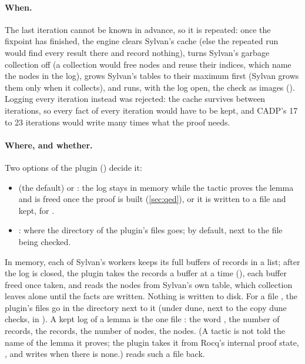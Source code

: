 \paragraph{When.} The last iteration cannot be known in advance, so it is
repeated: once the fixpoint has finished, the engine clears Sylvan's cache
(else the repeated run would find every result there and record nothing),
turns Sylvan's garbage collection off (a collection would free nodes and
reuse their indices, which name the nodes in the log), grows Sylvan's
tables to their maximum first (Sylvan grows them only when it collects),
and runs, with the log open, the check as images
(). Logging every
iteration instead was rejected: the cache survives between iterations, so
every fact of every iteration would have to be kept, and CADP's 17 to 23
iterations would write many times what the proof needs.

\paragraph{Where, and whether.} Two options of the plugin
() decide it:
\begin{itemize}
\item {} (the default) or :
  the log stays in memory while the tactic proves the lemma and is freed
  once the proof is built (\cref{sec:qed}), or it is written to a file and
  kept, for .
\item {}: where the directory of
  the plugin's files goes; by default, next to the file being checked.
\end{itemize}
In memory, each of Sylvan's workers keeps its full buffers of records
in a list; after the log is closed, the plugin takes the records a
buffer at a time (), each buffer freed once taken,
and reads the nodes from Sylvan's own table, which collection leaves
alone until the facts are written. Nothing is written to disk. For a
file , the plugin's files go in the directory 
next to it (under dune, next to the copy dune checks, in
). A kept log of a lemma  is the one file
: the word , the number of records,
the records, the number of nodes, the nodes. (A tactic is not told the
name of the lemma it proves; the plugin takes it from Rocq's internal
proof state, , and writes  when
there is none.)  reads such a file back.

